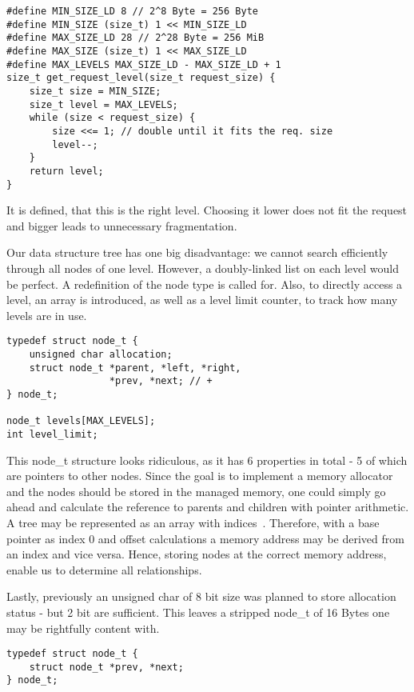 \documentclass[runningheads]{llncs}
\begin{document}
\begin{verbatim}
#define MIN_SIZE_LD 8 // 2^8 Byte = 256 Byte
#define MIN_SIZE (size_t) 1 << MIN_SIZE_LD
#define MAX_SIZE_LD 28 // 2^28 Byte = 256 MiB
#define MAX_SIZE (size_t) 1 << MAX_SIZE_LD
#define MAX_LEVELS MAX_SIZE_LD - MAX_SIZE_LD + 1
size_t get_request_level(size_t request_size) {
    size_t size = MIN_SIZE;
    size_t level = MAX_LEVELS;
    while (size < request_size) {
        size <<= 1; // double until it fits the req. size
        level--;
    }
    return level;
}
\end{verbatim}

It is defined, that this is the right level. Choosing it lower does not fit 
the request and bigger leads to unnecessary fragmentation.

Our data structure tree has one big disadvantage: we cannot search efficiently
through all nodes of one level. However, a doubly-linked list on each level 
would be perfect. A redefinition of the node type is called for. Also,
to directly access a level, an array is introduced, as well as a level
limit counter, to track how many levels are in use.

\begin{verbatim}
typedef struct node_t {
    unsigned char allocation;
    struct node_t *parent, *left, *right,
                  *prev, *next; // +
} node_t;

node_t levels[MAX_LEVELS];
int level_limit;
\end{verbatim}

This node\_t structure looks ridiculous, as it has 6 properties in total - 5 of
which are pointers to other nodes. Since the goal is to implement a memory
allocator and the nodes should be stored in the managed memory, one could
simply go ahead and calculate the reference to parents and children with
pointer arithmetic. A tree may be represented as an array with 
indices~\cite{binary_tree_index_properties}. Therefore, with a base pointer
as index 0 and offset calculations a memory address may be derived from an 
index and vice versa. Hence, storing nodes at the correct memory address,
enable us to determine all relationships.

Lastly, previously an unsigned char of 8 bit size was planned to store 
allocation status - but 2 bit are sufficient. This leaves a stripped node\_t
of 16 Bytes one may be rightfully content with.

\begin{verbatim}
typedef struct node_t {
    struct node_t *prev, *next;
} node_t;
\end{verbatim}
\end{document}
